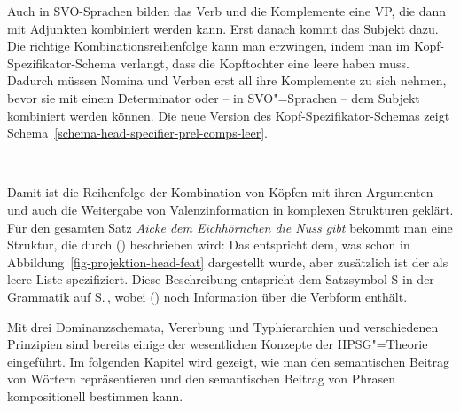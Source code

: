 Auch in SVO-Sprachen bilden das Verb und die Komplemente eine VP, die dann mit Adjunkten kombiniert
werden kann. Erst danach kommt das Subjekt dazu. Die richtige Kombinationsreihenfolge kann man
erzwingen, indem man im Kopf-Spezifikator-Schema verlangt, dass die Kopftochter eine leere \compsl
haben muss. Dadurch müssen Nomina und Verben erst all ihre Komplemente zu sich nehmen, bevor sie mit
einem Determinator oder -- in SVO"=Sprachen -- dem Subjekt kombiniert werden können. Die neue
Version des Kopf-Spezifikator-Schemas zeigt Schema~\ref{schema-head-specifier-prel-comps-leer}.
\begin{schema}
\label{schema-head-specifier-prel-comps-leer}
 \impl\\
\end{schema}


\noindent
Damit ist die Reihenfolge der Kombination von Köpfen mit ihren Argumenten und auch die Weitergabe
von Valenzinformation in komplexen Strukturen geklärt. Für den gesamten Satz \emph{Aicke dem Eichhörnchen die Nuss gibt} bekommt man eine Struktur, die durch ()
beschrieben wird:
\ea
{}
\z
Das entspricht dem, was schon in Abbildung~\ref{fig-projektion-head-feat} dargestellt wurde, aber
zusätzlich ist der \sprw als leere Liste spezifiziert. Diese Beschreibung entspricht dem Satzsymbol S in der Grammatik auf
S.\,\pageref{bsp-grammatik-psg}, wobei () noch Information über die Verbform enthält.



Mit drei Dominanzschemata, Vererbung und Typhierarchien und verschiedenen Prinzipien sind bereits einige der wesentlichen Konzepte der HPSG"=Theorie eingeführt. Im folgenden
Kapitel wird gezeigt, wie man den semantischen Beitrag von Wörtern repräsentieren und den
semantischen Beitrag von Phrasen kompositionell bestimmen kann.


